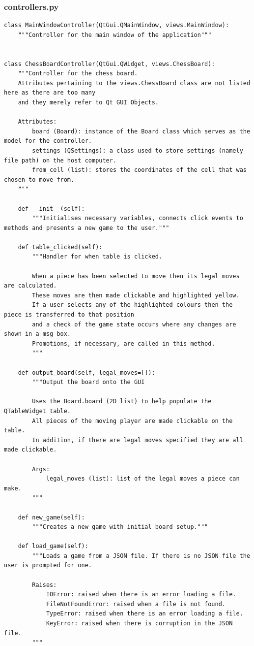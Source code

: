 \documentclass[twoside, 12pt]{report}
\begin{document}
\subsubsection{controllers.py}
\begin{verbatim}
class MainWindowController(QtGui.QMainWindow, views.MainWindow):
	"""Controller for the main window of the application"""


class ChessBoardController(QtGui.QWidget, views.ChessBoard):
	"""Controller for the chess board.
	Attributes pertaining to the views.ChessBoard class are not listed here as there are too many
	and they merely refer to Qt GUI Objects.

	Attributes:
		board (Board): instance of the Board class which serves as the model for the controller.
		settings (QSettings): a class used to store settings (namely file path) on the host computer.
		from_cell (list): stores the coordinates of the cell that was chosen to move from.
	"""
	
	def __init__(self):
		"""Initialises necessary variables, connects click events to methods and presents a new game to the user."""
		
	def table_clicked(self):
		"""Handler for when table is clicked.
	
		When a piece has been selected to move then its legal moves are calculated.
		These moves are then made clickable and highlighted yellow.
		If a user selects any of the highlighted colours then the piece is transferred to that position
		and a check of the game state occurs where any changes are shown in a msg box.
		Promotions, if necessary, are called in this method.
		"""
		
 	def output_board(self, legal_moves=[]):
		"""Output the board onto the GUI
	
		Uses the Board.board (2D list) to help populate the QTableWidget table.
		All pieces of the moving player are made clickable on the table.
		In addition, if there are legal moves specified they are all made clickable.

		Args:
			legal_moves (list): list of the legal moves a piece can make.
		"""
	
 	def new_game(self):
		"""Creates a new game with initial board setup."""
	
 	def load_game(self):
		"""Loads a game from a JSON file. If there is no JSON file the user is prompted for one.
	
		Raises:
			IOError: raised when there is an error loading a file.
			FileNotFoundError: raised when a file is not found.
			TypeError: raised when there is an error loading a file.
			KeyError: raised when there is corruption in the JSON file.
		"""
	

\end{verbatim}
\end{document}
